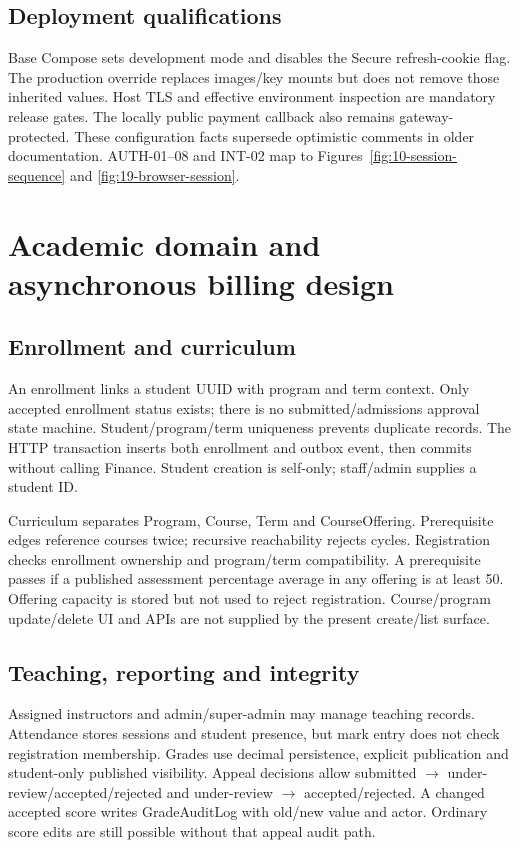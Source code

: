 \documentclass[10pt,a4paper]{article}
\begin{document}
\subsection{Deployment qualifications}
Base Compose sets development mode and disables the Secure refresh-cookie flag.
The production override replaces images/key mounts but does not remove those
inherited values. Host TLS and effective environment inspection are mandatory
release gates. The locally public payment callback also remains gateway-protected.
These configuration facts supersede optimistic comments in older documentation.
AUTH-01--08 and INT-02 map to Figures~\ref{fig:10-session-sequence} and
\ref{fig:19-browser-session}.

\clearpage
\section{Academic domain and asynchronous billing design}
\subsection{Enrollment and curriculum}
An enrollment links a student UUID with program and term context.
Only accepted enrollment status exists; there is no submitted/admissions approval
state machine. Student/program/term uniqueness prevents duplicate records. The HTTP
transaction inserts both enrollment and outbox event, then commits without calling
Finance. Student creation is self-only; staff/admin supplies a student ID.

Curriculum separates Program, Course, Term and CourseOffering.
Prerequisite edges reference courses twice; recursive reachability rejects cycles.
Registration checks enrollment ownership and program/term compatibility. A prerequisite
passes if a published assessment percentage average in any offering is at least 50.
Offering capacity is stored but not used to reject registration. Course/program
update/delete UI and APIs are not supplied by the present create/list surface.

\subsection{Teaching, reporting and integrity}
Assigned instructors and admin/super-admin may manage teaching records.
Attendance stores sessions and student presence, but mark entry does not check
registration membership. Grades use decimal persistence, explicit publication and
student-only published visibility. Appeal decisions allow submitted $\rightarrow$
under-review/accepted/rejected and under-review $\rightarrow$ accepted/rejected.
A changed accepted score writes GradeAuditLog with old/new value and actor.
Ordinary score edits are still possible without that appeal audit path.
\end{document}
